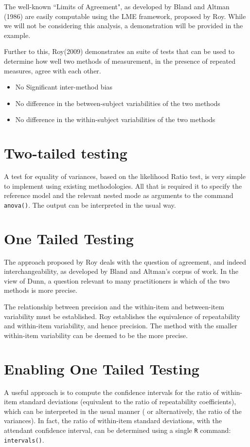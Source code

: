 \documentclass[12pt, a4paper]{report}
\theoremstyle{plain}
\theoremstyle{definition}
\theoremstyle{remark}
\begin{document}
	The well-known ``Limits of Agreement", as developed by Bland and Altman (1986) are easily computable using the LME framework, proposed by Roy. While we will not be considering this analysis, a demonstration will be provided in the example.
	
	Further to this, Roy(2009) demonstrates an suite of tests that can be used to determine how well two methods of measurement, in the presence of repeated measures, agree with each other.
	
	\begin{itemize}\itemsep0.5cm
		\item No Significant inter-method bias
		\item No difference in the between-subject variabilities of the two methods
		\item No difference in the within-subject variabilities of the two methods
	\end{itemize}
	
	\section{Two-tailed testing} A test for equality of variances, based on the likelihood Ratio test, is very simple to implement using existing methodologies. All that is required it to specify the reference model and the relevant nested mode as arguments to the command \texttt{anova()}. The output can be interpreted in the usual way.
	
	\section{One Tailed Testing}
	The approach proposed by Roy deals with the question of agreement, and indeed interchangeability, as developed by Bland and Altman's corpus of work. In the view of Dunn, a question relevant to many practitioners is which of the two methods is more precise.
	
	The relationship between precision and the within-item and between-item variability must be established. Roy establishes the equivalence of repeatability and within-item variability, and hence precision.  The method with the smaller within-item variability can be deemed to be the more precise.
	
	\section{Enabling One Tailed Testing}
	A useful approach is to compute the confidence intervals for the ratio of within-item standard deviations (equivalent to the ratio of repeatability coefficients), which can be interpreted in the usual manner ( or alternatively, the ratio of the variances). In fact, the ratio of within-item standard deviations, with the attendant confidence interval,  can be determined using a single \texttt{R} command: \texttt{intervals()}.
	
\end{document}
